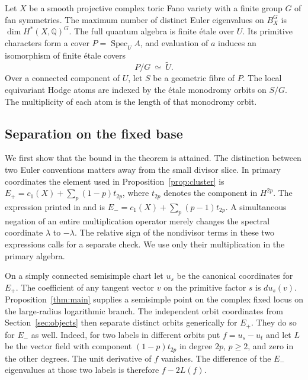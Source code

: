 \begin{theorem}\label{thm:atomcover}
Let $X$ be a smooth projective complex toric Fano variety with a finite group $G$ of fan symmetries. The maximum number of distinct Euler eigenvalues on $B_X^G$ is $\dim H^*(X,\mathbb Q)^G$. The full quantum algebra is finite étale over $U$. Its primitive characters form a cover $P=\operatorname{Spec}_U A$, and evaluation of $a$ induces an isomorphism of finite étale covers
\[
                          P/G\ \simeq\ \widetilde U .
\]
Over a connected component of $U$, let $S$ be a geometric fibre of $P$. The local equivariant Hodge atoms are indexed by the étale monodromy orbits on $S/G$. The multiplicity of each atom is the length of that monodromy orbit.
\end{theorem}

\subsection{Separation on the fixed base}
We first show that the bound in the theorem is attained. The distinction between two Euler conventions matters away from the small divisor slice. In primary coordinates the element used in Proposition~\ref{prop:cluster} is $E_+=c_1(X)+\sum_p(1-p)t_{2p}$, where $t_{2p}$ denotes the component in $H^{2p}$. The expression printed in \cite[\S2.1]{CKK} and \cite[(3.20), (3.31)]{KKPY} is $E_-=c_1(X)+\sum_p(p-1)t_{2p}$. A simultaneous negation of an entire multiplication operator merely changes the spectral coordinate $\lambda$ to $-\lambda$. The relative sign of the nondivisor terms in these two expressions calls for a separate check. We use only their multiplication in the primary algebra.

On a simply connected semisimple chart let $u_s$ be the canonical coordinates for $E_+$. The coefficient of any tangent vector $v$ on the primitive factor $s$ is $du_s(v)$. Proposition~\ref{thm:main} supplies a semisimple point on the complex fixed locus on the large-radius logarithmic branch. The independent orbit coordinates from Section~\ref{sec:objects} then separate distinct orbits generically for $E_+$. They do so for $E_-$ as well. Indeed, for two labels in different orbits put $f=u_s-u_t$ and let $L$ be the vector field with component $(1-p)t_{2p}$ in degree $2p$, $p\ge2$, and zero in the other degrees. The unit derivative of $f$ vanishes. The difference of the $E_-$ eigenvalues at those two labels is therefore $f-2L(f)$.

